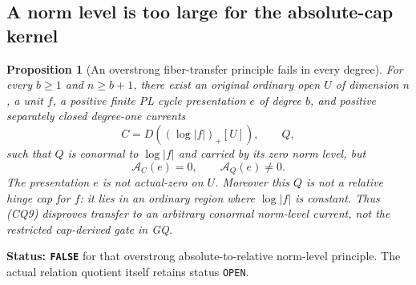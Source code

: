 \documentclass[11pt,a4paper]{article}
\numberwithin{equation}{section}
\newtheorem{proposition}[theorem]{Proposition}
\theoremstyle{definition}
\theoremstyle{remark}
\begin{document}
\subsection{A norm level is too large for the absolute-cap kernel}

\begin{proposition}[An overstrong fiber-transfer principle fails in every degree]
\label{prop:r12-norm-level-absolute-cap-counterexample}
For every \(b\ge1\) and \(n\ge b+1\), there exist an original
ordinary open \(U\) of dimension \(n\), a unit \(f\), a positive
finite PL cycle presentation \(e\) of degree \(b\), and positive
separately closed degree-one currents
\[
       C=D((\log|f|)_+[U]),\qquad Q,
\]
such that \(Q\) is conormal to \(\log|f|\) and carried by its
zero norm level, but
\[
                       \mathcal A_C(e)=0,\qquad
                       \mathcal A_Q(e)\ne0.
 \tag{CQ9}
\]
The presentation \(e\) is not actual-zero on \(U\).
Moreover this \(Q\) is not a relative hinge cap for \(f\):
it lies in an ordinary region where \(\log|f|\) is constant.
Thus (CQ9) disproves transfer to an \emph{arbitrary conormal
norm-level current}, not the restricted cap-derived gate in GQ.
\end{proposition}

\noindent\textbf{Status: \texttt{FALSE}} for that overstrong
absolute-to-relative norm-level principle. The actual relation
quotient itself retains status \texttt{OPEN}.
\end{document}
